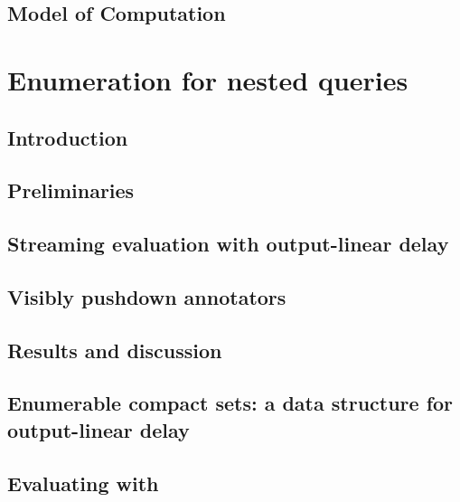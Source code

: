 \documentclass[pdftex]{pucthesis}	%
\begin{document}
\section{Model of Computation}




\chapter[ENUMERATION FOR NESTED QUERIES]{Enumeration for nested queries} \label{ch1}

\section{Introduction}\label{nested:sec:intro}


\section{Preliminaries}\label{nested:sec:prelim}


\section{Streaming evaluation with output-linear delay}\label{nested:sec:enum}


\section{Visibly pushdown annotators}\label{nested:sec:vpann}


\section{Results and discussion}\label{nested:sec:results}


\section{Enumerable compact sets: a data structure for output-linear delay}\label{nested:sec:ds}


\section{Evaluating \vpannnames with \lindelay}\label{nested:sec:eval}

\end{document}
